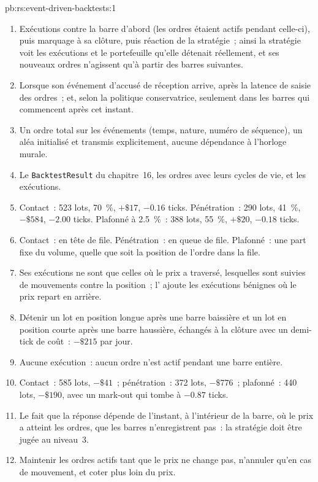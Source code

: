 \begin{solution}{pb:rs:event-driven-backtests:1}
\begin{enumerate}
\item Exécutions contre la barre d'abord (les ordres étaient actifs pendant celle-ci), puis marquage à sa clôture, puis réaction de la stratégie~; ainsi la
stratégie voit les exécutions et le portefeuille qu'elle détenait réellement, et ses nouveaux ordres n'agissent qu'à partir des barres suivantes.
\item Lorsque son événement d'accusé de réception arrive, après la latence de saisie des ordres~; et, selon la politique conservatrice, seulement dans les barres qui commencent après cet instant.
\item Un ordre total sur les événements (temps, nature, numéro de séquence), un aléa initialisé et transmis explicitement, aucune dépendance à l'horloge murale.
\item Le \texttt{BacktestResult} du chapitre~16, les ordres avec leurs cycles de vie, et les exécutions.
\item Contact~: 523 lots, 70~\%, $+\$17$, $-0.16$ ticks. Pénétration~: 290 lots, 41~\%, $-\$584$, $-2.00$ ticks. Plafonné à 2.5~\%~: 388 lots, 55~\%, $+\$20$,
$-0.18$ ticks.
\item Contact~: en tête de file. Pénétration~: en queue de file. Plafonné~: une part fixe du volume, quelle que soit la position de l'ordre dans la file.
\item Ses exécutions ne sont que celles où le prix a traversé, lesquelles sont suivies de mouvements contre la position~; l' ajoute les exécutions bénignes
où le prix repart en arrière.
\item Détenir un lot en position longue après une barre baissière et un lot en position courte après une barre haussière, échangés à la clôture avec un demi-tick de coût~: $-\$215$ par jour.
\item Aucune exécution~: aucun ordre n'est actif pendant une barre entière.
\item Contact~: 585 lots, $-\$41$~; pénétration~: 372 lots, $-\$776$~; plafonné~: 440 lots, $-\$190$, avec un mark-out qui tombe à $-0.87$ ticks.
\item Le fait que la réponse dépende de l'instant, à l'intérieur de la barre, où le prix a atteint les ordres, que les barres n'enregistrent pas~: la stratégie doit être jugée au niveau~3.
\item Maintenir les ordres actifs tant que le prix ne change pas, n'annuler qu'en cas de mouvement, et coter plus loin du prix.

\end{enumerate}
\end{solution}
